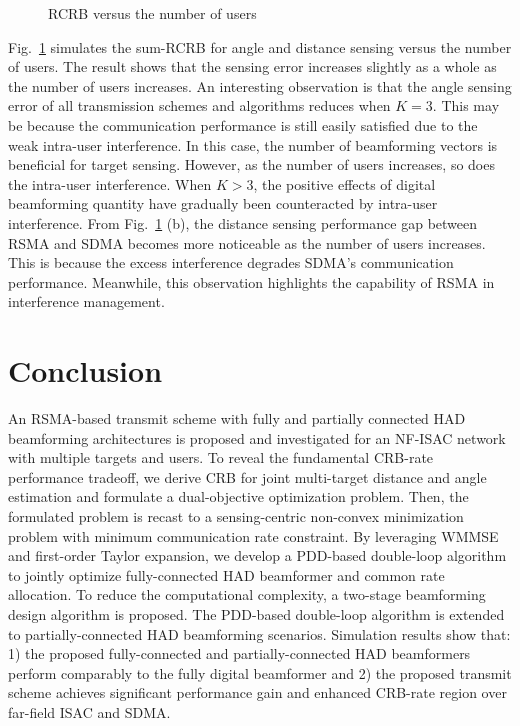 \documentclass[10pt,journal,twocolumn]{IEEEtran}
\begin{document}
\begin{figure}[tbp]
	\centering
	\centering
	\caption{RCRB versus the number of users}
	\label{Fig_user}
    \vspace{-0.3cm}
\end{figure}
Fig.~\ref{Fig_user} simulates the sum-RCRB for angle and distance sensing versus the number of users. The result shows that the sensing error increases slightly as a whole as the number of users increases. An interesting observation is that the angle sensing error of all transmission schemes and algorithms reduces when $K=3$. This may be because the communication performance is still easily satisfied due to the weak intra-user interference. In this case, the number of beamforming vectors is beneficial for target sensing. However, as the number of users increases, so does the intra-user interference. When $K>3$, the positive effects of digital beamforming quantity have gradually been counteracted by intra-user interference. From Fig.~\ref{Fig_user} (b), the distance sensing performance gap between RSMA and SDMA becomes more noticeable as the number of users increases. This is because the excess interference degrades SDMA's communication performance. Meanwhile, this observation highlights the capability of RSMA in interference management.

\section{Conclusion}\label{Section VI}
An RSMA-based transmit scheme with fully and partially connected HAD beamforming architectures is proposed and investigated for an NF-ISAC network with multiple targets and users. To reveal the fundamental CRB-rate performance tradeoff, we derive CRB for joint multi-target distance and angle estimation and formulate a dual-objective optimization problem. Then, the formulated problem is recast to a sensing-centric non-convex minimization problem with minimum communication rate constraint. By leveraging WMMSE and first-order Taylor expansion, we develop a PDD-based double-loop algorithm to jointly optimize fully-connected HAD beamformer and common rate allocation. To reduce the computational complexity, a two-stage beamforming design algorithm is proposed. The PDD-based double-loop algorithm is extended to partially-connected HAD beamforming scenarios. Simulation results show that: 1) the proposed fully-connected and partially-connected HAD beamformers perform comparably to the fully digital beamformer and 2)  the proposed transmit scheme achieves significant performance gain and enhanced CRB-rate region over far-field ISAC and SDMA.
\end{document}
